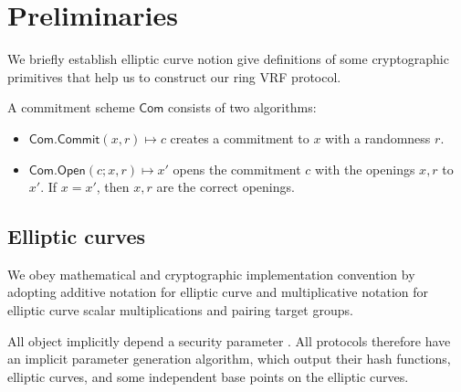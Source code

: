 \newcommand{\com}{\mathsf{Com}}
\newcommand{\open}{\mathsf{Open}}
\newcommand{\commit}{\mathsf{Commit}}
\section{Preliminaries} %
\label{sec:background}
We  briefly establish elliptic curve notion  give definitions of some cryptographic primitives that help us to construct our ring VRF protocol.



\begin{definition}
	A commitment scheme $ \com $ consists of two algorithms:
	\begin{itemize}
		\item $ \com.\commit(x,r) \mapsto c$ creates a commitment to $ x $ with a randomness $ r $.
		\item $ \com.\open(c;x,r)  \mapsto x'$ opens the commitment $ c $ with the openings $ x,r$ to $ x' $. If $ x = x' $, then $ x,r $ are the correct openings.
	\end{itemize}
\end{definition}
\subsection{Elliptic curves}
\label{sec:ec_background}


We obey mathematical and cryptographic implementation convention by 
adopting additive notation for elliptic curve and multiplicative notation
for elliptic curve scalar multiplications and pairing target groups.

All object implicitly depend a security parameter \secparam.
All protocols therefore have an implicit parameter generation algorithm,
which output their hash functions, elliptic curves, and
 some independent base points on the elliptic curves.

